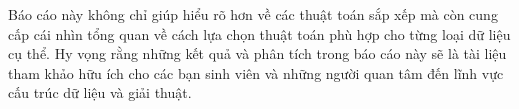 Báo cáo này không chỉ giúp hiểu rõ hơn về các thuật toán sắp xếp mà còn cung cấp cái nhìn tổng quan về cách lựa chọn thuật toán phù hợp cho từng loại dữ liệu cụ thể. Hy vọng rằng những kết quả và phân tích trong báo cáo này sẽ là tài liệu tham khảo hữu ích cho các bạn sinh viên và những người quan tâm đến lĩnh vực cấu trúc dữ liệu và giải thuật.
